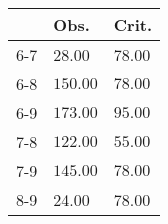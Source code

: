 \begin{table}[ht]
\centering
\begin{tabular}{rll}
  \hline
 & Obs. & Crit. \\ 
  \hline
6-7 & 28.00 & 78.00 \\ 
  6-8 & \(\mathbf{150.00}\) & \(\mathbf{78.00}\) \\ 
  6-9 & \(\mathbf{173.00}\) & \(\mathbf{95.00}\) \\ 
  7-8 & \(\mathbf{122.00}\) & \(\mathbf{55.00}\) \\ 
  7-9 & \(\mathbf{145.00}\) & \(\mathbf{78.00}\) \\ 
  8-9 & 24.00 & 78.00 \\ 
   \hline
\end{tabular}
\end{table}

